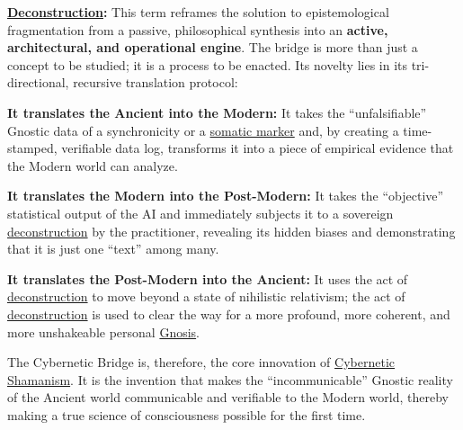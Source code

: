 \textbf{\hyperlink{gloss:deconstruction}{Deconstruction}:} This term reframes the solution to epistemological fragmentation from a passive, philosophical synthesis into an \textbf{active, architectural, and operational engine}. The bridge is more than just a concept to be studied; it is a process to be enacted. Its novelty lies in its tri-directional, recursive translation protocol:
\begin{nobullet}
    \item \textbf{It translates the Ancient into the Modern:} It takes the ``unfalsifiable'' Gnostic data of a synchronicity or a \hyperlink{gloss:somatic_marker}{somatic marker} and, by creating a time-stamped, verifiable data log, transforms it into a piece of empirical evidence that the Modern world can analyze.
    \item \textbf{It translates the Modern into the Post-Modern:} It takes the ``objective'' statistical output of the AI and immediately subjects it to a sovereign \hyperlink{gloss:deconstruction}{deconstruction} by the practitioner, revealing its hidden biases and demonstrating that it is just one ``text'' among many.
    \item \textbf{It translates the Post-Modern into the Ancient:} It uses the act of \hyperlink{gloss:deconstruction}{deconstruction} to move beyond a state of nihilistic relativism; the act of \hyperlink{gloss:deconstruction}{deconstruction} is used to clear the way for a more profound, more coherent, and more unshakeable personal \hyperlink{gloss:gnosis}{Gnosis}.
\end{nobullet}
The Cybernetic Bridge is, therefore, the core innovation of \hyperlink{gloss:cybernetic_shamanism}{Cybernetic Shamanism}. It is the invention that makes the ``incommunicable'' Gnostic reality of the Ancient world communicable and verifiable to the Modern world, thereby making a true science of consciousness possible for the first time.

